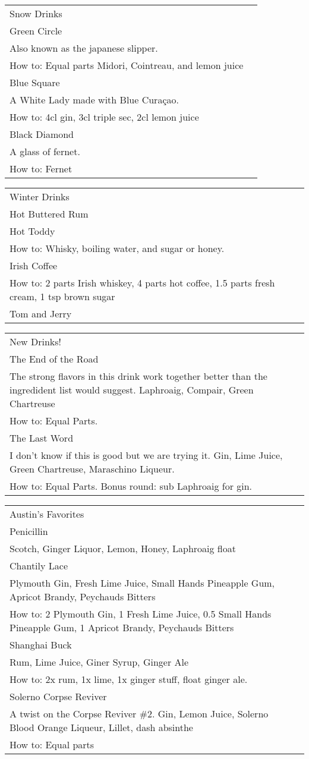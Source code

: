 \documentclass[12pt]{article}
\makeatletter
\newcommand*\ColText[1]{\textcolor{DarkColor}{#1}}
\newenvironment{Group}[1]
  {\noindent\begin{tabular*}{\textwidth}{@{}p{.8\linewidth}@{\extracolsep{\fill}}r@{}}
    {\fontsize{24}{29}\selectfont\ColText{#1}}\\[0.8em]}
  {\end{tabular*}}
\newcommand*\Entry[1]{%
  \sffamily#1 \\
}
\newcommand*\Expl[1]{
  \hspace*{1em}\footnotesize #1 \\
}
\newcommand*\HowTo[1]{
  \hspace*{1em}\footnotesize How to: \hspace*{1em}#1 \\
}
\makeatother
\begin{document}
\begin{Group}{Snow Drinks}

\Entry{Green Circle}
\Expl{Also known as the japanese slipper.}
\HowTo{Equal parts Midori, Cointreau, and lemon juice}

\Entry{Blue Square}
\Expl{A White Lady made with Blue Curaçao.}
\HowTo{4cl gin, 3cl triple sec, 2cl lemon juice}

\Entry{Black Diamond}
\Expl{A glass of fernet.}
\HowTo{Fernet}

\end{Group}

\vfill

\begin{Group}{Winter Drinks}
\Entry{Hot Buttered Rum}

\Entry{Hot Toddy}
\HowTo{Whisky, boiling water, and sugar or honey.}

\Entry{Irish Coffee}
\HowTo{2 parts Irish whiskey, 4 parts hot coffee, 1.5 parts fresh cream, 1 tsp brown sugar}

\Entry{Tom and Jerry}
\end{Group}

\vfill

\begin{Group}{New Drinks!}

\Entry{The End of the Road}
\Expl{The strong flavors in this drink work together better than the ingredident list would suggest. Laphroaig, Compair, Green Chartreuse}
\HowTo{Equal Parts.}

\Entry{The Last Word}
\Expl{I don't know if this is good but we are trying it. Gin, Lime Juice, Green Chartreuse, Maraschino Liqueur.}
\HowTo{Equal Parts. Bonus round: sub Laphroaig for gin.}

\end{Group}

\vfill

\begin{Group}{Austin's Favorites}

\Entry{Penicillin}
\Expl{Scotch, Ginger Liquor, Lemon, Honey, Laphroaig float}

\Entry{Chantily Lace}
\Expl{Plymouth Gin, Fresh Lime Juice, Small Hands Pineapple Gum, Apricot Brandy, Peychauds Bitters}
\HowTo{2 Plymouth Gin, 1 Fresh Lime Juice, 0.5 Small Hands Pineapple Gum, 1 Apricot Brandy, Peychauds Bitters}

\Entry{Shanghai Buck}
\Expl{Rum, Lime Juice, Giner Syrup, Ginger Ale}
\HowTo{2x rum, 1x lime, 1x ginger stuff, float ginger ale.}

\Entry{Solerno Corpse Reviver}
\Expl{A twist on the Corpse Reviver \#2. Gin, Lemon Juice, Solerno Blood Orange Liqueur, Lillet, dash absinthe}
\HowTo{Equal parts}

\end{Group}
\end{document}

